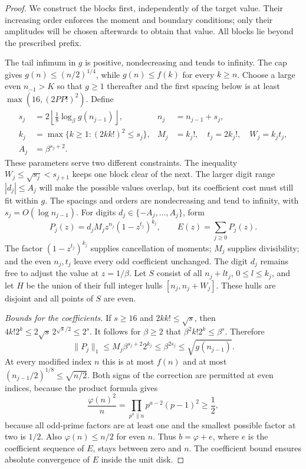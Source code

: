 \documentclass[11pt]{article}
\theoremstyle{plain}
\theoremstyle{definition}
\theoremstyle{remark}
\begin{document}
\begin{proof}
We construct the blocks first, independently of the target value.
Their increasing order enforces the moment and boundary conditions;
only their amplitudes will be chosen afterwards to obtain that value.
All blocks lie beyond the prescribed prefix.

The tail infimum in $g$ is positive, nondecreasing and tends to infinity.
The cap gives $g(n)\le(n/2)^{1/4}$, while $g(n)\le f(k)$ for every
$k\ge n$. Choose a large even $n_{-1}>K$ so that $g\ge1$ thereafter
and the first spacing below is at least $\max(16,(2PP!)^2)$. Define
\[
 \begin{aligned}
 s_j&=2\left\lfloor\tfrac18\log_\beta g(n_{j-1})\right\rfloor,
 &n_j&=n_{j-1}+s_j,\\
 k_j&=\max\{k\ge1:(2kk!)^2\le s_j\},
 &M_j&=k_j!,\quad t_j=2k_j!,\quad W_j=k_jt_j,\\
 A_j&=\beta^{s_j+2}.
 \end{aligned}
\]
These parameters serve two different constraints. The inequality
$W_j\le\sqrt{s_j}<s_{j+1}$ keeps one block clear of the next.
The larger digit range $|d_j|\le A_j$ will make the possible values
overlap, but its coefficient cost must still fit within $g$.
The spacings and orders are nondecreasing and tend to infinity,
with $s_j=O(\log n_{j-1})$. For digits
$d_j\in\{-A_j,\ldots,A_j\}$, form
\[
 P_j(z)=d_jM_jz^{n_j}(1-z^{t_j})^{k_j},\qquad E(z)=\sum_{j\ge0}P_j(z).
\]
The factor $(1-z^{t_j})^{k_j}$ supplies cancellation of moments;
$M_j$ supplies divisibility; and the even $n_j,t_j$ leave every odd
coefficient unchanged. The digit $d_j$ remains free to adjust the value
at $z=1/\beta$.
Let $S$ consist of all $n_j+lt_j$, $0\le l\le k_j$, and let $H$ be
the union of their full integer hulls $[n_j,n_j+W_j]$. These hulls are
disjoint and all points of $S$ are even.

\emph{Bounds for the coefficients.} If $s\ge16$ and $2kk!\le\sqrt s$, then
$4k!2^k\le2\sqrt s\,2^{\sqrt s/2}\le2^s$. It follows for $\beta\ge2$
that $\beta^2k!2^k\le\beta^s$. Therefore
\begin{equation}\label{long249:eq:signed-budget}
 \|P_j\|_1\le M_j\beta^{s_j+2}2^{k_j}
 \le\beta^{2s_j}\le\sqrt{g(n_{j-1})}.
\end{equation}
At every modified index $n$ this is at most $f(n)$ and at most
$(n_{j-1}/2)^{1/8}\le\sqrt{n/2}$. Both signs of the correction are permitted at even indices, because
the product formula gives
\[
 \frac{\varphi(n)^2}{n}
 =\prod_{p^a\parallel n}p^{a-2}(p-1)^2\ge\frac12,
\]
because all odd-prime factors are at least one and the smallest possible
factor at two is $1/2$. Also $\varphi(n)\le n/2$ for even $n$.
Thus $b=\varphi+e$, where $e$ is the coefficient sequence of $E$, stays
between zero and $n$. The coefficient bound ensures absolute convergence
of $E$ inside the unit disk.


\end{proof}
\end{document}
